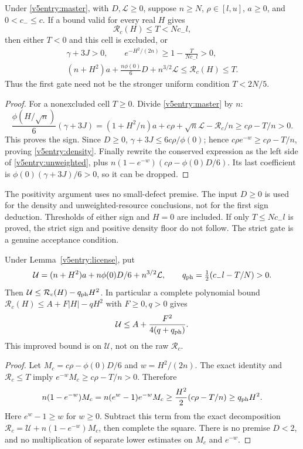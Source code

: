 \begin{lemma}\label{v5entry:license}
Under \eqref{v5entry:master}, with $D,\mathcal L\ge0$, suppose
$n\ge N$, $\rho\in[l,u]$, $a\ge0$, and
$0<c_-\le c$. If a bound valid for every real $H$ gives
\begin{equation}\label{v5entry:gate}
 \mathcal R_c(H)\le T<Nc_-l,
\end{equation}
then either $T<0$ and this cell is excluded, or
\begin{gather}
 \gamma+3J>0,\qquad
 e^{-H^2/(2n)}\ge1-\frac{T}{Nc_-l}>0,\label{v5entry:density}\\
 (n+H^2)a+\frac{n\phi(0)}6D+n^{3/2}\mathcal L
                      \le\mathcal R_c(H)\le T.\label{v5entry:unweighted}
\end{gather}
Thus the first gate need not be the stronger uniform condition $T<2N/5$.
\end{lemma}
\begin{proof}
For a nonexcluded cell $T\ge0$. Divide \eqref{v5entry:master} by $n$:
\[
 \frac{\phi(H/\sqrt n)}6(\gamma+3J)
 =(1+H^2/n)a+c\rho+\sqrt n\mathcal L-\mathcal R_c/n
 \ge c\rho-T/n>0.
\]
This proves the sign. Since $D\ge0$,
$\gamma+3J\le6c\rho/\phi(0)$; hence
$c\rho e^{-w}\ge c\rho-T/n$, proving \eqref{v5entry:density}.
Finally rewrite the conserved expression as the left side of
\eqref{v5entry:unweighted}, plus
$n(1-e^{-w})(c\rho-\phi(0)D/6)$.
Its last coefficient is $\phi(0)(\gamma+3J)/6>0$, so it can be dropped.
\end{proof}

The positivity argument uses no small-defect premise. The input $D\ge0$
is used for the density and unweighted-resource conclusions, not for the
first sign deduction. Thresholds of either sign and $H=0$ are included.
If only $T\le Nc_-l$ is proved, the strict sign and positive density
floor do not follow. The strict gate is a genuine acceptance condition.

\begin{lemma}\label{v5entry:phase}
Under Lemma~\ref{v5entry:license}, put
\[
 \mathcal U=(n+H^2)a+n\phi(0)D/6+n^{3/2}\mathcal L,
 \qquad q_{\rm ph}=\tfrac12(c_-l-T/N)>0.
\]
Then $\mathcal U\le\mathcal R_c(H)-q_{\rm ph}H^2$.
In particular a complete polynomial bound
$\mathcal R_c(H)\le A+F|H|-qH^2$ with $F\ge0,q>0$ gives
\[
 \mathcal U\le A+\frac{F^2}{4(q+q_{\rm ph})}.
\]
This improved bound is on $\mathcal U$, not on the raw $\mathcal R_c$.
\end{lemma}
\begin{proof}
Let $M_c=c\rho-\phi(0)D/6$ and $w=H^2/(2n)$.
The exact identity and $\mathcal R_c\le T$ imply
$e^{-w}M_c\ge c\rho-T/n>0$. Therefore
\[
 n(1-e^{-w})M_c=n(e^w-1)e^{-w}M_c
 \ge\frac{H^2}{2}(c\rho-T/n)\ge q_{\rm ph}H^2.
\]
Here $e^w-1\ge w$ for $w\ge0$. Subtract this term from the exact
decomposition $\mathcal R_c=\mathcal U+n(1-e^{-w})M_c$, then complete
the square. There is no premise $D<2$, and no multiplication of separate
lower estimates on $M_c$ and $e^{-w}$.
\end{proof}

